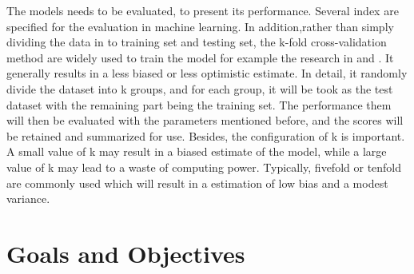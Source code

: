 \documentclass[ a4paper, 12pt, oneside ]{article} %
\begin{document}
The models needs to be evaluated, to present its performance. Several index are specified for the evaluation in machine learning. In addition,rather than simply dividing the data in to training set and testing set, the k-fold cross-validation method are widely used to train the model for example the research in \cite{5424006} and \cite{7749468}. It generally results in a less biased or less optimistic estimate. In detail, it randomly divide the dataset into k groups, and for each group, it will be took as the test dataset with the remaining part being the training set. The performance them will then be evaluated with the parameters mentioned before, and the scores will be retained and summarized for use. Besides, the configuration of k is important. A small value of k may result in a biased estimate of the model, while a large value of k may lead to a waste of computing power. Typically, fivefold or tenfold are commonly used which will result in a estimation of low bias and a modest variance.


\section{Goals and Objectives} \label{goals}
\end{document}

